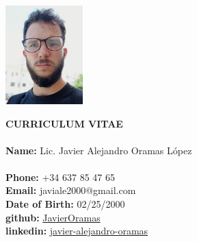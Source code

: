 \documentclass{article}
\begin{document}
\pagestyle{empty} %

\begin{center}
    \begin{minipage}[t]{0.2\textwidth}
        \vspace{0pt}
        \includegraphics[width=3cm]{img.png}
    \end{minipage}
    \hspace{1cm}
    \begin{minipage}[t]{0.7\textwidth}
        \vspace{0pt}
        \textbf{CURRICULUM VITAE}\\\\
        \textbf{Name:} Lic. Javier Alejandro Oramas López\\
        \\
        \textbf{Phone:} +34 637 85 47 65 \\
        \textbf{Email:} javiale2000@gmail.com \\
        \textbf{Date of Birth:}  02/25/2000\\
        \textbf{github:} \href{https://github.com/JavierOramas}{JavierOramas} \\
        \textbf{linkedin:} \href{https://www.linkedin.com/in/javier-alejandro-oramas-l%C3%B3pez-7ab47b160/}{javier-alejandro-oramas} \\
    \end{minipage}
\end{center}

\end{document}
